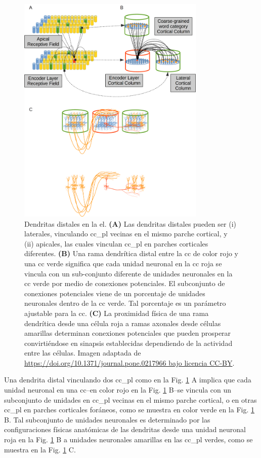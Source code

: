{\begin{figure}[ht!]
    \centering
    \includegraphics[width=0.8\textwidth]{DistalDendrites1.png}
    \caption{Dendritas distales en la \gls{el}.
	    \textbf{(A)} Las dendritas distales pueden ser (i) laterales, vinculando \gls{cc_pl} vecinas en el mismo parche cortical, y (ii) apicales, las cuales vinculan \gls{cc_pl} en parches corticales diferentes.
	    \textbf{(B)} Una rama dendrítica  distal entre la \gls{cc} de color rojo y una \gls{cc} verde significa que cada unidad neuronal en la \gls{cc} roja se vincula con un sub-conjunto diferente de unidades neuronales en la \gls{cc} verde por medio de conexiones potenciales. El subconjunto de conexiones potenciales viene de un porcentaje de unidades neuronales dentro de la \gls{cc} verde. Tal porcentaje es un parámetro ajustable para la \gls{cc}.
    \textbf{(C)} La proximidad física de una rama dendrítica desde una célula roja a ramas axonales desde células amarillas determinan conexiones potenciales que pueden prosperar convirtiéndose en sinapsis establecidas dependiendo de la actividad entre las células.
    Imagen adaptada de \url{https://doi.org/10.1371/journal.pone.0217966 bajo licencia CC-BY}.}
    \label{fig:DistalDendrites1}
\end{figure}

Una dendrita distal vinculando dos \gls{cc_pl} como en la Fig. \ref{fig:DistalDendrites1} A implica que cada unidad neuronal en una \gls{cc}--en color rojo en la Fig. \ref{fig:DistalDendrites1} B--se vincula con un subconjunto de unidades en \gls{cc_pl} vecinas en el mismo parche cortical, o en otras \gls{cc_pl} en parches corticales foráneos, como se muestra en color verde en la Fig. \ref{fig:DistalDendrites1} B.
Tal subconjunto de unidades neuronales es determinado por las configuraciones físicas anatómicas de las dendritas desde una unidad neuronal roja en la Fig. \ref{fig:DistalDendrites1} B a unidades neuronales amarillas en las \gls{cc_pl} verdes, como se muestra en la Fig. \ref{fig:DistalDendrites1} C.

}
